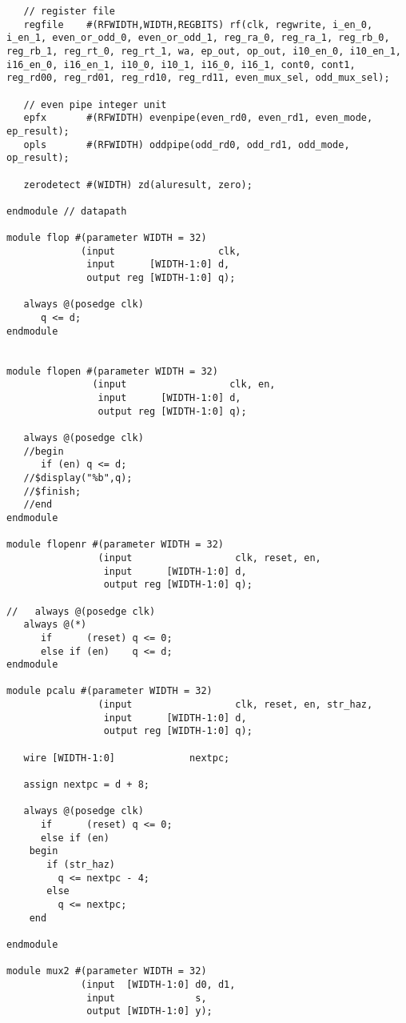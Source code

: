 \documentclass[preprint,authoryear,12pt]{elsarticle}
\begin{document}
\begin{verbatim}
   // register file
   regfile    #(RFWIDTH,WIDTH,REGBITS) rf(clk, regwrite, i_en_0, i_en_1, even_or_odd_0, even_or_odd_1, reg_ra_0, reg_ra_1, reg_rb_0, reg_rb_1, reg_rt_0, reg_rt_1, wa, ep_out, op_out, i10_en_0, i10_en_1, i16_en_0, i16_en_1, i10_0, i10_1, i16_0, i16_1, cont0, cont1, reg_rd00, reg_rd01, reg_rd10, reg_rd11, even_mux_sel, odd_mux_sel);

   // even pipe integer unit
   epfx       #(RFWIDTH) evenpipe(even_rd0, even_rd1, even_mode, ep_result);
   opls       #(RFWIDTH) oddpipe(odd_rd0, odd_rd1, odd_mode, op_result);

   zerodetect #(WIDTH) zd(aluresult, zero);

endmodule // datapath

module flop #(parameter WIDTH = 32)
             (input                  clk, 
              input      [WIDTH-1:0] d, 
              output reg [WIDTH-1:0] q);

   always @(posedge clk)
      q <= d;
endmodule

		   
module flopen #(parameter WIDTH = 32)
               (input                  clk, en,
                input      [WIDTH-1:0] d, 
                output reg [WIDTH-1:0] q);

   always @(posedge clk)
   //begin
      if (en) q <= d;
   //$display("%b",q);
   //$finish;
   //end
endmodule

module flopenr #(parameter WIDTH = 32)
                (input                  clk, reset, en,
                 input      [WIDTH-1:0] d, 
                 output reg [WIDTH-1:0] q);
 
//   always @(posedge clk)
   always @(*)
      if      (reset) q <= 0;
      else if (en)    q <= d;
endmodule

module pcalu #(parameter WIDTH = 32)
                (input                  clk, reset, en, str_haz,
                 input      [WIDTH-1:0] d, 
                 output reg [WIDTH-1:0] q);

   wire [WIDTH-1:0] 			nextpc;

   assign nextpc = d + 8;
   
   always @(posedge clk)
      if      (reset) q <= 0;
      else if (en)
	begin
	   if (str_haz)
	     q <= nextpc - 4;
	   else
	     q <= nextpc;
	end

endmodule

module mux2 #(parameter WIDTH = 32)
             (input  [WIDTH-1:0] d0, d1, 
              input              s, 
              output [WIDTH-1:0] y);


\end{verbatim}
\end{document}
